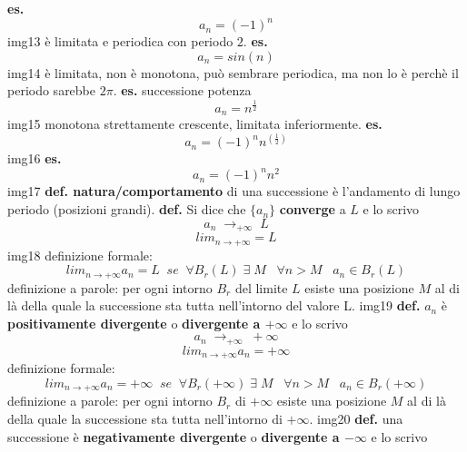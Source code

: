 \newline
\textbf{es.}
\[
    a_n = (-1)^n
\]
img13
\newline
è limitata e periodica con periodo $2$.
\newline
\textbf{es.}
\[
    a_n = sin(n)
\]
img14
\newline
è limitata, non è monotona, può sembrare periodica, ma non lo è perchè il periodo sarebbe $2\pi$.
\newline
\textbf{es.} successione potenza
\[
    a_n = n ^{\frac{1}{2}}
\]
img15
\newline
monotona strettamente crescente, limitata inferiormente.
\newline
\textbf{es.}
\[
    a_n=(-1)^nn^{(\frac{1}{2})}
\]
img16
\newline
\textbf{es.}
\[
    a_n=(-1)^nn^{2}
\]
img17
\newline
\newline
\textbf{def. natura/comportamento} di una successione è l'andamento di lungo periodo (posizioni grandi).
\newline
\textbf{def.} Si dice che $\{a_n\}$ \textbf{converge} a $L$ e lo scrivo
\[
    a_n \; \rightarrow_{+ \infty} \; L
\]
\[
    lim_{n\rightarrow + \infty} = L
\]
img18
\newline
definizione formale:
\[
    lim_{n\rightarrow + \infty} a_n = L \;\;se\;\; \forall B_r(L) \;\exists \; M \;\;\; \forall n>M \;\;\; a_n \in B_r(L)
\]
definizione a parole:
\newline
per ogni intorno $B_r$ del limite $L$ esiste una posizione $M$ al di là della quale la successione sta tutta nell'intorno del valore L.
\newline
img19
\newline
\newline
\textbf{def.} $a_n$ è \textbf{positivamente divergente} o \textbf{divergente a $+\infty$} e lo scrivo
\[
    a_n \; \rightarrow_{+ \infty} \; + \infty
\]
\[
    lim_{n\rightarrow +\infty} a_n = + \infty
\]
\newline
definizione formale:
\[
    lim_{n\rightarrow + \infty} a_n = +\infty \;\;se\;\; \forall B_r(+\infty) \;\exists \; M \;\;\; \forall n>M \;\;\; a_n \in B_r(+\infty)
\]
definizione a parole:
\newline
per ogni intorno $B_r$ di $+\infty$ esiste una posizione $M$ al di là della quale la successione sta tutta nell'intorno di $+\infty$.
\newline
img20
\newline
\textbf{def.} una successione è \textbf{negativamente divergente} o \textbf{divergente a $-\infty$} e lo scrivo
